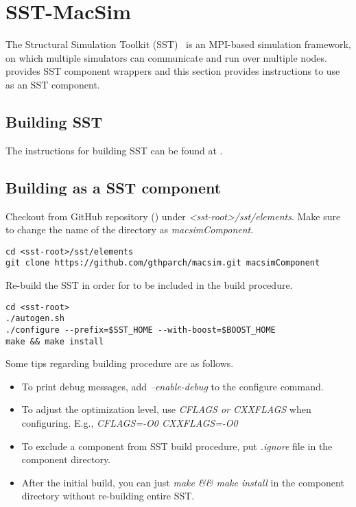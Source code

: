 \section{SST-MacSim}
\label{sec:sst}

The Structural Simulation Toolkit (SST)~\cite{sst} is an MPI-based 
simulation framework, on which multiple simulators can communicate 
and run over multiple nodes. 
\SIM provides SST component wrappers and this section provides 
instructions to use \SIM as an SST component.


\subsection{Building SST}

The instructions for building SST can be found at 
.


\subsection{Building \SIM as a SST component}

Checkout \SIM from GitHub repository () under \textit{<sst-root>/sst/elements}.
Make sure to change the name of the directory as \textit{macsimComponent}.

\begin{Verbatim}
cd <sst-root>/sst/elements
git clone https://github.com/gthparch/macsim.git macsimComponent
\end{Verbatim}
Re-build the SST in order for \SIM to be included in the build procedure.

\begin{Verbatim}
cd <sst-root>
./autogen.sh
./configure --prefix=$SST_HOME --with-boost=$BOOST_HOME
make && make install
\end{Verbatim}
Some tips regarding building procedure are as follows.
\begin{itemize}
  \item To print debug messages, add \textit{--enable-debug} to the configure command.
  \item To adjust the optimization level, use \textit{CFLAGS or CXXFLAGS} when configuring. E.g., \textit{CFLAGS=-O0 CXXFLAGS=-O0}
  \item To exclude a component from SST build procedure, put \textit{.ignore} file in the component directory.
  \item After the initial build, you can just \textit{make \&\& make install} in the component directory without re-building entire SST.
\end{itemize}




